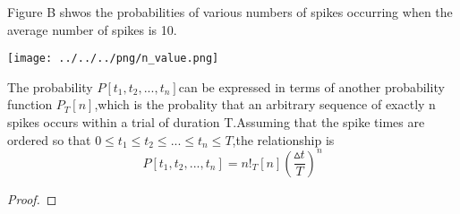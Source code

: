 \begin{exm}
    Figure B shwos the probabilities of various numbers of spikes occurring when the average number of spikes is 10.
\end{exm}    
\begin{center}
    \label{Figure 1.11 (A)}    
    \texttt{[image: ../../../png/n\_value.png]}    \\
\end{center}



\begin{thm}
    The probability $P[t_1,t_2,...,t_n]$can be expressed in terms of another probability function $P_T[n]$,which is the probality that an arbitrary sequence of exactly n spikes occurs within a trial of duration T.Assuming that the spike times are ordered so that $0\leq t_1\leq t_2\leq ...\leq t_n\leq T$,the relationship is 
    \begin{equation}
        P[t_1,t_2,...,t_n]=n!{_T[n](\frac{\vartriangle t}{T})^n}        
    \end{equation}
    \begin{proof}
    \end{proof}
\end{thm}


